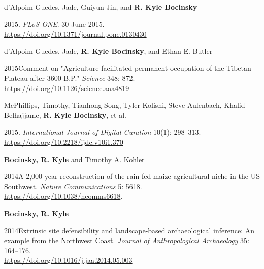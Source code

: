 d'Alpoim Guedes, Jade, Guiyun Jin, and {\bf R. Kyle Bocinsky}
\begin{list1}
\item[] 2015\hspace{.2cm}{The impact of climate on the spread of rice to North-eastern China: A new look at the data from Shandong Province}. \emph{PLoS ONE}. 30 June 2015.\\\href{https://doi.org/10.1371/journal.pone.0130430}{https://doi.org/10.1371/journal.pone.0130430}
\end{list1}


d'Alpoim Guedes, Jade, {\bf R. Kyle Bocinsky}, and Ethan E. Butler
\begin{list1}
\item[] 2015\hspace{.2cm}Comment on "Agriculture facilitated permanent occupation of the Tibetan Plateau after 3600 B.P." \emph{Science} 348: 872.\\\href{https://doi.org/10.1126/science.aaa4819}{https://doi.org/10.1126/science.aaa4819}
\end{list1}


McPhillips, Timothy, Tianhong Song, Tyler Kolisni, Steve Aulenbach, Khalid Belhajjame, {\bf R. Kyle Bocinsky}, et al.
\begin{list1}
\item[] 2015\hspace{.2cm}{YesWorkflow: A User-Oriented, Language-Independent Tool for Recovering Workflow Information from Scripts}. \emph{International Journal of Digital Curation} 10(1): 298–313.\\\href{https://doi.org/10.2218/ijdc.v10i1.370}{https://doi.org/10.2218/ijdc.v10i1.370}
\end{list1}


{\bf Bocinsky, R. Kyle} and Timothy A. Kohler
\begin{list1}
\item[] 2014\hspace{.2cm}A 2,000-year reconstruction of the rain-fed maize agricultural niche in the US Southwest. \emph{Nature Communications} 5: 5618.\\\href{https://doi.org/10.1038/ncomms6618}{https://doi.org/10.1038/ncomms6618}.
\end{list1}


{\bf Bocinsky, R. Kyle}
\begin{list1}
\item[] 2014\hspace{.2cm}Extrinsic site defensibility and landscape-based archaeological inference: An example from the Northwest Coast. \emph{Journal of Anthropological Archaeology} 35: 164–176.\\\href{https://doi.org/10.1016/j.jaa.2014.05.003}{https://doi.org/10.1016/j.jaa.2014.05.003}
\end{list1}


